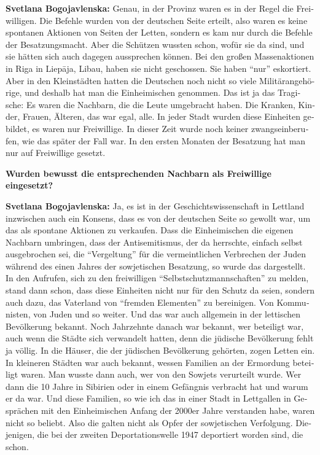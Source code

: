 \begin{otherlanguage}{ngerman}
\textbf{Svetlana Bogojavlenska:} Genau, in der Provinz waren es in der Regel die Freiwilligen. Die Befehle wurden von der deutschen Seite erteilt, also waren es keine spontanen Aktionen von Seiten der Letten, sondern es kam nur durch die Befehle der Besatzungsmacht. Aber die Schützen wussten schon, wofür sie da sind, und sie hätten sich auch dagegen aussprechen können.
Bei den großen Massenaktionen in Riga in Liepāja, Libau, haben sie nicht geschossen. Sie haben "`nur"' eskortiert. Aber in den Kleinstädten hatten die Deutschen noch nicht so viele Militärangehörige, und deshalb hat man die Einheimischen genommen. Das ist ja das Tragische: Es waren die Nachbarn, die die Leute umgebracht haben. Die Kranken, Kinder, Frauen, Älteren, das war egal, alle. In jeder Stadt wurden diese Einheiten gebildet, es waren nur Freiwillige. In dieser Zeit wurde noch keiner zwangseinberufen, wie das später der Fall war. In den ersten Monaten der Besatzung hat man nur auf Freiwillige gesetzt.

\textbf{Wurden bewusst die entsprechenden Nachbarn als Freiwillige eingesetzt?}

\textbf{Svetlana Bogojavlenska:} Ja, es ist in der Geschichtswissenschaft in Lettland inzwischen auch ein Konsens, dass es von der deutschen Seite so gewollt war, um das als spontane Aktionen zu verkaufen. Dass die Einheimischen die eigenen Nachbarn umbringen, dass der Antisemitismus, der da herrschte, einfach selbst ausgebrochen sei, die "`Vergeltung"' für die vermeintlichen Verbrechen der Juden während des einen Jahres der sowjetischen Besatzung, so wurde das dargestellt. In den Aufrufen, sich zu den freiwilligen "`Selbstschutzmannschaften"' zu melden, stand dann schon, dass diese Einheiten nicht nur für den Schutz da seien, sondern auch dazu, das Vaterland von "`fremden Elementen"' zu bereinigen. Von Kommunisten, von Juden und so weiter. Und das war auch allgemein in der lettischen Bevölkerung bekannt. Noch Jahrzehnte danach war bekannt, wer beteiligt war, auch wenn die Städte sich verwandelt hatten, denn die jüdische Bevölkerung fehlt ja völlig. In die Häuser, die der jüdischen Bevölkerung gehörten, zogen Letten ein. In kleineren Städten war auch bekannt, wessen Familien an der Ermordung beteiligt waren. Man wusste dann auch, wer von den Sowjets verurteilt wurde. Wer dann die 10 Jahre in Sibirien oder in einem Gefängnis verbracht hat und warum er da war. Und diese Familien, so wie ich das in einer Stadt in Lettgallen in Gesprächen mit den Einheimischen Anfang der 2000er Jahre verstanden habe, waren nicht so beliebt. Also die galten nicht als Opfer der sowjetischen Verfolgung. Diejenigen, die bei der zweiten Deportationswelle 1947 deportiert worden sind, die schon.


\end{otherlanguage}
